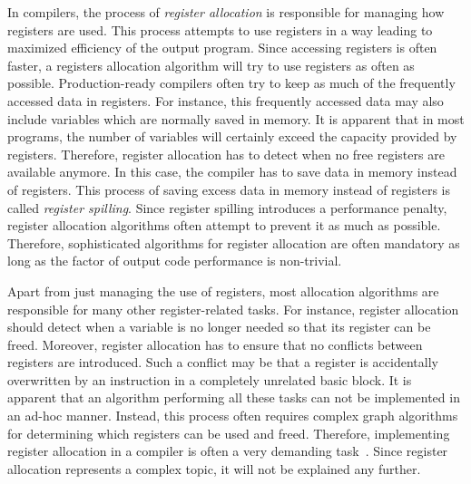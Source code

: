 In compilers, the process of \emph{register allocation} is responsible for managing how registers are used.
This process attempts to use registers in a way leading to maximized efficiency of the output program.
Since accessing registers is often faster, a registers allocation algorithm will try to use registers as often as possible.
Production-ready compilers often try to keep as much of the frequently accessed data in registers.
For instance, this frequently accessed data may also include variables which are normally saved in memory.
It is apparent that in most programs, the number of variables will certainly exceed the capacity provided by registers.
Therefore, register allocation has to detect when no free registers are available anymore.
In this case, the compiler has to save data in memory instead of registers.
This process of saving excess data in memory instead of registers is called \emph{register spilling}.
Since register spilling introduces a performance penalty, register allocation algorithms often attempt to prevent it as much as possible.
Therefore, sophisticated algorithms for register allocation are often mandatory as long as the factor of output code performance is non-trivial.

Apart from just managing the use of registers, most allocation algorithms are responsible for many other register-related tasks.
For instance, register allocation should detect when a variable is no longer needed so that its register can be freed.
Moreover, register allocation has to ensure that no conflicts between registers are introduced.
Such a conflict may be that a register is accidentally overwritten by an instruction in a completely unrelated basic block.
It is apparent that an algorithm performing all these tasks can not be implemented in an ad-hoc manner.
Instead, this process often requires complex graph algorithms for determining which registers can be used and freed.
Therefore, implementing register allocation in a compiler is often a very demanding task~\cite[pp.212-214]{Watson2017}.
Since register allocation represents a complex topic, it will not be explained any further.

%
%

